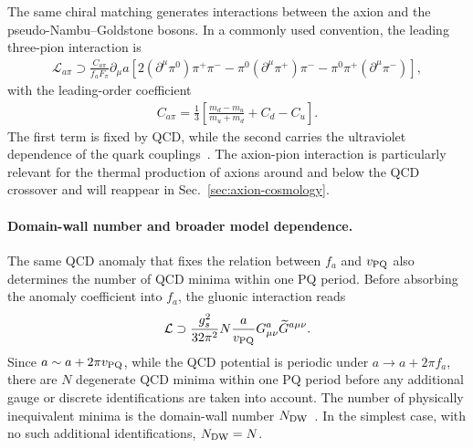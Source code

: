 \documentclass[review]{elsarticle}
\numberwithin{equation}{section}
\numberwithin{table}{section}
\numberwithin{figure}{section}
\begin{document}
The same chiral matching generates interactions between the axion and the pseudo-Nambu--Goldstone bosons. In a commonly used convention, the leading three-pion interaction is
\begin{align}
    \mathcal{L}_{a\pi}
    \supset
    \frac{C_{a\pi}}{f_aF_\pi}
    \partial_\mu a
    \left[
        2(\partial^\mu\pi^0)\pi^+\pi^-
        -
        \pi^0(\partial^\mu\pi^+)\pi^-
        -
        \pi^0\pi^+(\partial^\mu\pi^-)
    \right],
    \label{eq:axion-pion-coupling}
\end{align}
with the leading-order coefficient~\cite{DiLuzio:2022gsc,DiLuzio:2023tqe}
\begin{align}
    C_{a\pi}
    =
    \frac{1}{3}
    \left[
        \frac{m_d-m_u}{m_u+m_d}
        +
        C_d-C_u
    \right].
    \label{eq:axion-pion-C}
\end{align}
The first term is fixed by QCD, while the second carries the ultraviolet dependence of the quark couplings~\cite{GrilliDiCortona:2015jxo,DiLuzio:2022gsc,DiLuzio:2023tqe}. The axion-pion interaction is particularly relevant for the thermal production of axions around and below the QCD crossover and will reappear in Sec.~\ref{sec:axion-cosmology}.

\paragraph{Domain-wall number and broader model dependence.}

The same QCD anomaly that fixes the relation between $f_a$ and $v_{\rm PQ}$ also determines the number of QCD minima within one PQ period. Before absorbing the anomaly coefficient into $f_a$, the gluonic interaction reads
\begin{align}
    \mathcal{L}
    \supset
    \frac{g_s^2}{32\pi^2}
    N\frac{a}{v_{\rm PQ}}
    G^a_{\mu\nu}\widetilde G^{a\mu\nu}.
    \label{eq:fa-anomaly-normalisation}
\end{align}
Since $a\sim a+2\pi v_{\rm PQ}$, while the QCD potential is periodic under $a\rightarrow a+2\pi f_a$, there are $N$ degenerate QCD minima within one PQ period before any additional gauge or discrete identifications are taken into account. The number of physically inequivalent minima is the domain-wall number $N_{\rm DW}$~\cite{Sikivie:1982qv}. In the simplest case, with no such additional identifications, $N_{\rm DW}=N$.
\end{document}
